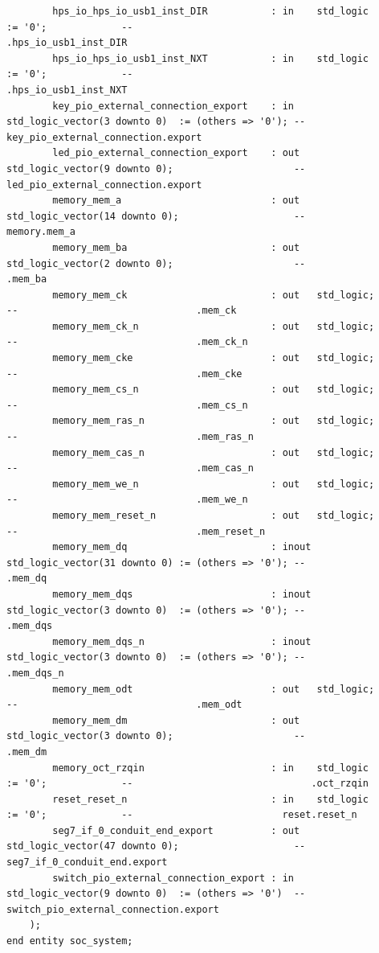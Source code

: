 \documentclass[conference]{IEEEtran}
\begin{document}
\begin{lstlisting}
		hps_io_hps_io_usb1_inst_DIR           : in    std_logic                     := '0';             --                               .hps_io_usb1_inst_DIR
		hps_io_hps_io_usb1_inst_NXT           : in    std_logic                     := '0';             --                               .hps_io_usb1_inst_NXT
		key_pio_external_connection_export    : in    std_logic_vector(3 downto 0)  := (others => '0'); --    key_pio_external_connection.export
		led_pio_external_connection_export    : out   std_logic_vector(9 downto 0);                     --    led_pio_external_connection.export
		memory_mem_a                          : out   std_logic_vector(14 downto 0);                    --                         memory.mem_a
		memory_mem_ba                         : out   std_logic_vector(2 downto 0);                     --                               .mem_ba
		memory_mem_ck                         : out   std_logic;                                        --                               .mem_ck
		memory_mem_ck_n                       : out   std_logic;                                        --                               .mem_ck_n
		memory_mem_cke                        : out   std_logic;                                        --                               .mem_cke
		memory_mem_cs_n                       : out   std_logic;                                        --                               .mem_cs_n
		memory_mem_ras_n                      : out   std_logic;                                        --                               .mem_ras_n
		memory_mem_cas_n                      : out   std_logic;                                        --                               .mem_cas_n
		memory_mem_we_n                       : out   std_logic;                                        --                               .mem_we_n
		memory_mem_reset_n                    : out   std_logic;                                        --                               .mem_reset_n
		memory_mem_dq                         : inout std_logic_vector(31 downto 0) := (others => '0'); --                               .mem_dq
		memory_mem_dqs                        : inout std_logic_vector(3 downto 0)  := (others => '0'); --                               .mem_dqs
		memory_mem_dqs_n                      : inout std_logic_vector(3 downto 0)  := (others => '0'); --                               .mem_dqs_n
		memory_mem_odt                        : out   std_logic;                                        --                               .mem_odt
		memory_mem_dm                         : out   std_logic_vector(3 downto 0);                     --                               .mem_dm
		memory_oct_rzqin                      : in    std_logic                     := '0';             --                               .oct_rzqin
		reset_reset_n                         : in    std_logic                     := '0';             --                          reset.reset_n
		seg7_if_0_conduit_end_export          : out   std_logic_vector(47 downto 0);                    --          seg7_if_0_conduit_end.export
		switch_pio_external_connection_export : in    std_logic_vector(9 downto 0)  := (others => '0')  -- switch_pio_external_connection.export
	);
end entity soc_system;


\end{lstlisting}
\end{document}
